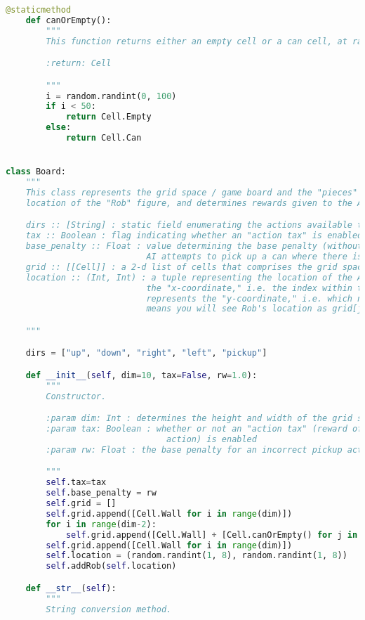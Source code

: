 \documentclass[12pt,a4paper]{article}
\begin{document}
\begin{lstlisting}[language=Python,numbers=none,basicstyle=\tiny]
    @staticmethod
    def canOrEmpty():
        """
        This function returns either an empty cell or a can cell, at random.

        :return: Cell

        """
        i = random.randint(0, 100)
        if i < 50:
            return Cell.Empty
        else:
            return Cell.Can


class Board:
    """
    This class represents the grid space / game board and the "pieces" on it. It maintains the
    location of the "Rob" figure, and determines rewards given to the AI for different actions.

    dirs :: [String] : static field enumerating the actions available to the AI
    tax :: Boolean : flag indicating whether an "action tax" is enabled (True) or not (False)
    base_penalty :: Float : value determining the base penalty (without tax) returned when the
                            AI attempts to pick up a can where there is no can
    grid :: [[Cell]] : a 2-d list of cells that comprises the grid space
    location :: (Int, Int) : a tuple representing the location of the AI. For (i, j), i represents
                            the "x-coordinate," i.e. the index within the nested list, and j
                            represents the "y-coordinate," i.e. which nested list to look for. This
                            means you will see Rob's location as grid[j][i].

    """

    dirs = ["up", "down", "right", "left", "pickup"]

    def __init__(self, dim=10, tax=False, rw=1.0):
        """
        Constructor.

        :param dim: Int : determines the height and width of the grid space, including walls
        :param tax: Boolean : whether or not an "action tax" (reward of -0.5 for taking any
                                action) is enabled
        :param rw: Float : the base penalty for an incorrect pickup action

        """
        self.tax=tax
        self.base_penalty = rw
        self.grid = []
        self.grid.append([Cell.Wall for i in range(dim)])
        for i in range(dim-2):
            self.grid.append([Cell.Wall] + [Cell.canOrEmpty() for j in range(dim-2)] + [Cell.Wall])
        self.grid.append([Cell.Wall for i in range(dim)])
        self.location = (random.randint(1, 8), random.randint(1, 8))
        self.addRob(self.location)

    def __str__(self):
        """
        String conversion method.


\end{lstlisting}
\end{document}
